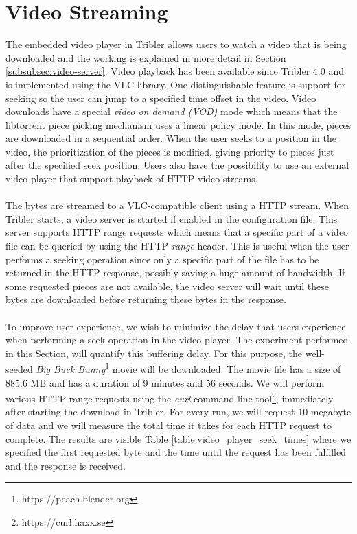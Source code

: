 \section{Video Streaming}
The embedded video player in Tribler allows users to watch a video that is being downloaded and the working is explained in more detail in Section \ref{subsubsec:video-server}. Video playback has been available since Tribler 4.0 and is implemented using the VLC library. One distinguishable feature is support for seeking so the user can jump to a specified time offset in the video. Video downloads have a special \emph{video on demand (VOD)} mode which means that the libtorrent piece picking mechanism uses a linear policy mode. In this mode, pieces are downloaded in a sequential order. When the user seeks to a position in the video, the prioritization of the pieces is modified, giving priority to pieces just after the specified seek position. Users also have the possibility to use an external video player that support playback of HTTP video streams.\\\\
The bytes are streamed to a VLC-compatible client using a HTTP stream. When Tribler starts, a video server is started if enabled in the configuration file. This server supports HTTP range requests which means that a specific part of a video file can be queried by using the HTTP \emph{range} header. This is useful when the user performs a seeking operation since only a specific part of the file has to be returned in the HTTP response, possibly saving a huge amount of bandwidth. If some requested pieces are not available, the video server will wait until these bytes are downloaded before returning these bytes in the response.\\\\
To improve user experience, we wish to minimize the delay that users experience when performing a seek operation in the video player. The experiment performed in this Section, will quantify this buffering delay. For this purpose, the well-seeded \emph{Big Buck Bunny}\footnote{https://peach.blender.org} movie will be downloaded. The movie file has a size of 885.6 MB and has a duration of 9 minutes and 56 seconds. We will perform various HTTP range requests using the \emph{curl} command line tool\footnote{https://curl.haxx.se}, immediately after starting the download in Tribler. For every run, we will request 10 megabyte of data and we will measure the total time it takes for each HTTP request to complete. The results are visible Table \ref{table:video_player_seek_times} where we specified the first requested byte and the time until the request has been fulfilled and the response is received.\\

